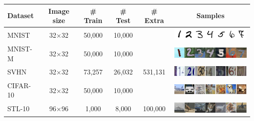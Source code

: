 \begin{table}[t]
  \centering
  \renewcommand{\arraystretch}{1.5}
  \begin{tabular}{@{}lccccc@{}}
    \toprule
    Dataset & Image size & \# Train & \# Test & \# Extra & Samples \\
    \midrule
    MNIST   & 32$\times$32 & 50,000 & 10,000 & & \includegraphics[align=c,width=5.3cm]{images/dataset_mnist} \\
    MNIST-M   & 32$\times$32 & 50,000 & 10,000 & & \includegraphics[align=c,width=5.3cm]{images/dataset_mnistm} \\
    SVHN   & 32$\times$32 & 73,257 & 26,032 & 531,131 & \includegraphics[align=c,width=5.3cm]{images/dataset_svhn} \\
    CIFAR-10   & 32$\times$32 & 50,000 & 10,000 & & \includegraphics[align=c,width=5.3cm]{images/dataset_cifar10} \\
    STL-10   & 96$\times$96 & 1,000 & 8,000 & 100,000 & \includegraphics[align=c,width=5.3cm]{images/dataset_stl10} \\
    \bottomrule
  \end{tabular}
  \label{hybridnet:tab:datasets}
\end{table}


